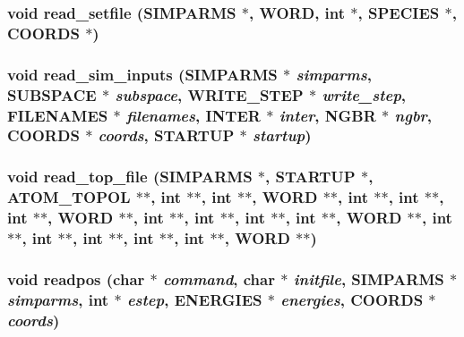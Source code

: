 \subsubsection{\setlength{\rightskip}{0pt plus 5cm}void read\_\-setfile ({\bf SIMPARMS} $\ast$, {\bf WORD}, int $\ast$, {\bf SPECIES} $\ast$, {\bf COORDS} $\ast$)}\label{thomas_2proto__input_8h_e933f1e046a12a502dce5163b9d58120}


\subsubsection{\setlength{\rightskip}{0pt plus 5cm}void read\_\-sim\_\-inputs ({\bf SIMPARMS} $\ast$ {\em simparms}, {\bf SUBSPACE} $\ast$ {\em subspace}, {\bf WRITE\_\-STEP} $\ast$ {\em write\_\-step}, {\bf FILENAMES} $\ast$ {\em filenames}, {\bf INTER} $\ast$ {\em inter}, {\bf NGBR} $\ast$ {\em ngbr}, {\bf COORDS} $\ast$ {\em coords}, {\bf STARTUP} $\ast$ {\em startup})}\label{thomas_2proto__input_8h_edbd265231f32e7e018beacafed09f18}


\subsubsection{\setlength{\rightskip}{0pt plus 5cm}void read\_\-top\_\-file ({\bf SIMPARMS} $\ast$, {\bf STARTUP} $\ast$, {\bf ATOM\_\-TOPOL} $\ast$$\ast$, int $\ast$$\ast$, int $\ast$$\ast$, {\bf WORD} $\ast$$\ast$, int $\ast$$\ast$, int $\ast$$\ast$, int $\ast$$\ast$, {\bf WORD} $\ast$$\ast$, int $\ast$$\ast$, int $\ast$$\ast$, int $\ast$$\ast$, int $\ast$$\ast$, {\bf WORD} $\ast$$\ast$, int $\ast$$\ast$, int $\ast$$\ast$, int $\ast$$\ast$, int $\ast$$\ast$, int $\ast$$\ast$, {\bf WORD} $\ast$$\ast$)}\label{thomas_2proto__input_8h_a8f8c0b46e83768a0d3a63bf8d68c4d2}


\subsubsection{\setlength{\rightskip}{0pt plus 5cm}void readpos (char $\ast$ {\em command}, char $\ast$ {\em initfile}, {\bf SIMPARMS} $\ast$ {\em simparms}, int $\ast$ {\em estep}, {\bf ENERGIES} $\ast$ {\em energies}, {\bf COORDS} $\ast$ {\em coords})}\label{thomas_2proto__input_8h_afcc7b2f64187d1467219aafd655b801}


